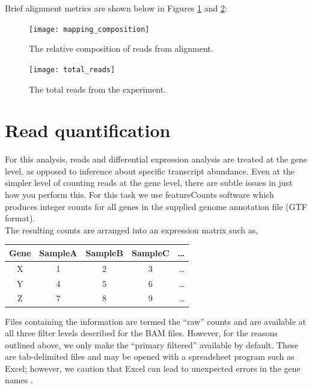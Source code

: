 \documentclass{article}
\begin{document}
Brief alignment metrics are shown below in Figures \ref{fig:relative_composition} and \ref{fig:total_counts}:

\begin{figure}[ht!]
  \centering
    \texttt{[image: mapping\_composition]}
    \caption{The relative composition of reads from alignment.}
    \label{fig:relative_composition}
\end{figure}

\begin{figure}[ht!]
  \centering
    \texttt{[image: total\_reads]}
    \caption{The total reads from the experiment.}
     \label{fig:total_counts}
\end{figure}

{%

\section{Read quantification}

For this analysis, reads and differential expression analysis are treated at the gene level, as opposed to inference about specific transcript abundance.  Even at the simpler level of counting reads at the gene level, there are subtle issues in just how you perform this.  For this task we use featureCounts software \cite{featureCounts} which produces integer counts for all genes in the supplied genome annotation file (GTF format).  \\

The resulting counts are arranged into an expression matrix such as,
\begin{center}
\begin{tabular}{c || c | c | c | r }
  Gene & SampleA & SampleB & SampleC & \ldots \\
  \hline			
  X & 1 & 2 & 3 & \ldots \\
  Y & 4 & 5 & 6 & \ldots\\
  Z & 7 & 8 & 9 & \ldots\\
  \hline  
\end{tabular}
\end{center}

Files containing the information are termed the ``raw'' counts and are available at all three filter levels described for the BAM files.  However, for the reasons outlined above, we only make the ``primary filtered'' available by default.  These are tab-delimited files and may be opened with a spreadsheet program such as Excel; however, we caution that Excel can lead to unexpected errors in the gene names \cite{excel}.

}
\end{document}
